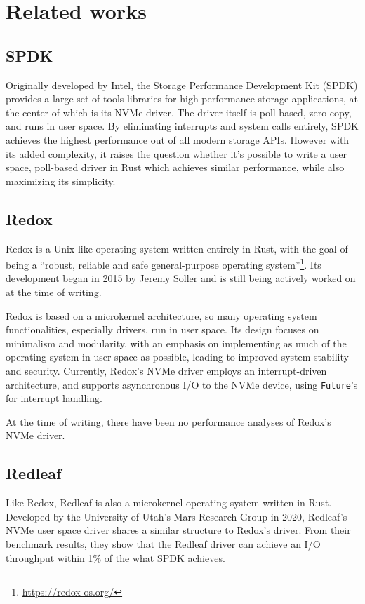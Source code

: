 \chapter{Related works}

\section{SPDK}
Originally developed by Intel, the Storage Performance Development Kit (SPDK) provides a large set of tools libraries for high-performance storage applications, at the center of which is its NVMe driver. The driver itself is poll-based, zero-copy, and runs in user space. By eliminating interrupts and system calls entirely, SPDK achieves the highest performance out of all modern storage APIs\cite{storage_api}. However with its added complexity, it raises the question whether it's possible to write a user space, poll-based driver in Rust which achieves similar performance, while also maximizing its simplicity.


\section{Redox}
Redox is a Unix-like operating system written entirely in Rust, with the goal of being a ``robust, reliable and safe general-purpose operating system''\footnote{\url{https://redox-os.org/}}. Its development began in 2015 by Jeremy Soller and is still being actively worked on at the time of writing.

Redox is based on a microkernel architecture, so many operating system functionalities, especially drivers, run in user space. Its design focuses on minimalism and modularity, with an emphasis on implementing as much of the operating system in user space as possible, leading to improved system stability and security. Currently, Redox's NVMe driver employs an interrupt-driven architecture, and supports asynchronous I/O to the NVMe device, using \texttt{Future}'s for interrupt handling.

At the time of writing, there have been no performance analyses of Redox's NVMe driver.

\section{Redleaf}
Like Redox, Redleaf is also a microkernel operating system written in Rust. Developed by the University of Utah's Mars Research Group in 2020, Redleaf's NVMe user space driver shares a similar structure to Redox's driver. From their benchmark results, they show that the Redleaf driver can achieve an I/O throughput within 1\% of the what SPDK achieves\cite{redleaf}.
